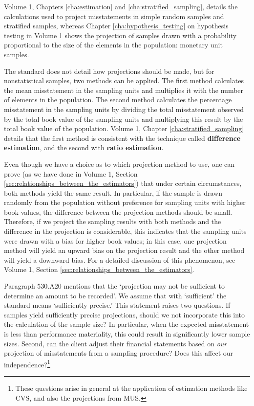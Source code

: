 Volume 1, Chapters \ref{cha:estimation} and \ref{cha:stratified_sampling}, details the calculations used to project misstatements in simple random samples and stratified samples, whereas Chapter \ref{cha:hypothesis_testing} on hypothesis testing in Volume 1 shows the projection of samples drawn with a probability proportional to the size of the elements in the population: monetary unit samples.

The standard does not detail how projections should be made, but for nonstatistical samples, two methods can be applied. The first method calculates the mean misstatement in the sampling units and multiplies it with the number of elements in the population. The second method calculates the percentage misstatement in the sampling units by dividing the total misstatement observed by the total book value of the sampling units and multiplying this result by the total book value of the population. Volume 1, Chapter \ref{cha:stratified_sampling} details that the first method is consistent with the technique called \textbf{difference estimation}, and the second with \textbf{ratio estimation}. 

Even though we have a choice as to which projection method to use, one can prove (as we have done in Volume 1, Section \ref{sec:relationships_between_the_estimators}) that under certain circumstances, both methods yield the same result. In particular, if the sample is drawn randomly from the population without preference for sampling units with higher book values, the difference between the projection methods should be small. Therefore, if we project the sampling results with both methods and the difference in the projection is considerable, this indicates that the sampling units were drawn with a bias for higher book values; in this case, one projection method will yield an upward bias on the projection result and the other method will yield a downward bias. For a detailed discussion of this phenomenon, see Volume 1, Section \ref{sec:relationships_between_the_estimators}.

Paragraph 530.A20 mentions that the `projection may not be sufficient to determine an amount to be recorded'. We assume that with `sufficient' the standard means `sufficiently precise.' This statement raises two questions. If samples yield sufficiently precise projections, should we not incorporate this into the calculation of the sample size? In particular, when the expected misstatement is less than performance materiality, this could result in significantly lower sample sizes. Second, can the client adjust their financial statements based on \emph{our} projection of misstatements from a sampling procedure? Does this affect our independence?\footnote{These questions arise in general at the application of estimation methods like CVS, and also the projections from MUS.}

